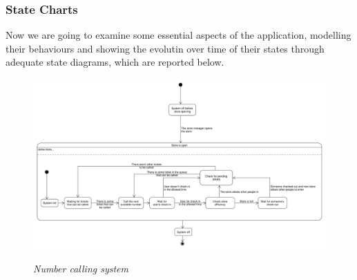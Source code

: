 \documentclass{article}
\begin{document}
		\newpage
		
		\subsubsection{State Charts}
		
		Now we are going to examine some essential aspects of the application, modelling their behaviours and showing the evolutin over time of their states through adequate state diagrams, which are reported below.
		
		\begin{figure}[!h]
			\centering
			\hspace*{-2.57cm}\includegraphics[scale=0.32]{StateCharts/number_calling_system.pdf} \\
			\caption{\emph{Number calling system}}
		\end{figure}
	
\end{document}
